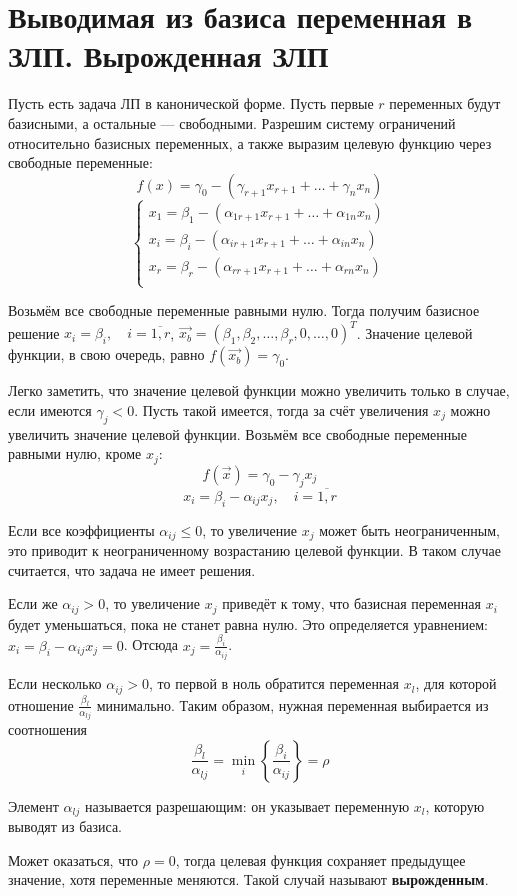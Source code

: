 \documentclass[17pt]{extarticle}
\begin{document}
\section{Выводимая из базиса переменная в ЗЛП. Вырожденная ЗЛП}

Пусть есть задача ЛП в канонической форме. Пусть первые \( r \) переменных будут базисными, а остальные — свободными. Разрешим систему ограничений относительно базисных переменных, а также выразим целевую функцию через свободные переменные:
\[
    f(x) = \gamma_0 - (\gamma_{r+1}x_{r+1} + \dots + \gamma_n x_n)
\]
\[
    \begin{cases}
        x_1 = \beta_1 - (\alpha_{1 r+1}x_{r+1} + \dots + \alpha_{1n}x_n) \\
        x_i = \beta_i - (\alpha_{i r+1}x_{r+1} + \dots + \alpha_{in}x_n) \\
        x_r = \beta_r - (\alpha_{r r+1}x_{r+1} + \dots + \alpha_{rn}x_n) \\
    \end{cases}
\]

Возьмём все свободные переменные равными нулю. Тогда получим базисное решение \( x_i = \beta_i, \quad i = \overline{1,r} \), \( \vec{x_b} = (\beta_1, \beta_2, \dots, \beta_r, 0, \dots, 0)^T \). Значение целевой функции, в свою очередь, равно \( f(\vec{x_b}) = \gamma_0 \).

Легко заметить, что значение целевой функции можно увеличить только в случае, если имеются \( \gamma_j < 0 \). Пусть такой имеется, тогда за счёт увеличения \( x_j \) можно увеличить значение целевой функции. Возьмём все свободные переменные равными нулю, кроме \( x_j \):
\[
    f(\vec{x}) = \gamma_0 - \gamma_j x_j
\]
\[
    x_i = \beta_i - \alpha_{ij} x_j, \quad i = \overline{1,r}
\]

Если все коэффициенты \( \alpha_{ij} \le 0 \), то увеличение \( x_j \) может быть неограниченным, это приводит к неограниченному возрастанию целевой функции. В таком случае считается, что задача не имеет решения.

Если же \( \alpha_{ij} > 0 \), то увеличение \( x_j \) приведёт к тому, что базисная переменная \( x_i \) будет уменьшаться, пока не станет равна нулю. Это определяется уравнением: \( x_i = \beta_i - \alpha_{ij} x_j = 0 \). Отсюда \( x_j = \frac{\beta_i}{\alpha_{ij}} \).

Если несколько \( \alpha_{ij} > 0 \), то первой в ноль обратится переменная \( x_l \), для которой отношение \( \frac{\beta_l}{\alpha_{lj}} \) минимально. Таким образом, нужная переменная выбирается из соотношения
\[
    \frac{\beta_l}{\alpha_{lj}} = \min\limits_i \left\{ \frac{\beta_i}{\alpha_{ij}} \right\} = \rho
\]

Элемент \( \alpha_{lj} \) называется разрешающим: он указывает переменную \( x_l \), которую выводят из базиса.

Может оказаться, что \( \rho = 0 \), тогда целевая функция сохраняет предыдущее значение, хотя переменные меняются. Такой случай называют \textbf{вырожденным}.
\end{document}
